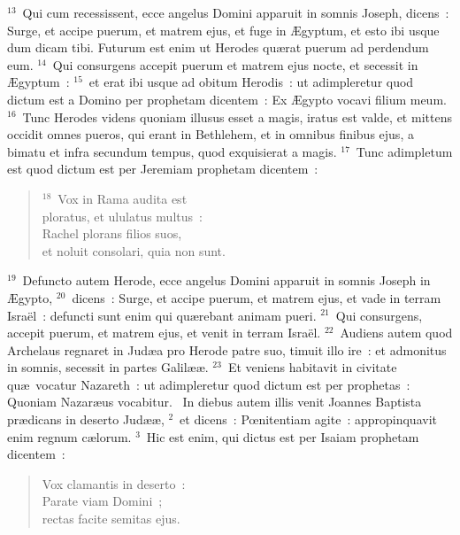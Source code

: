 ${}^{13}$~Qui cum recessissent, ecce angelus Domini apparuit in somnis Joseph, dicens~: Surge, et accipe puerum, et matrem ejus, et fuge in \AE gyptum, et esto ibi usque dum dicam tibi. Futurum est enim ut Herodes qu\ae rat puerum ad perdendum eum.
${}^{14}$~Qui consurgens accepit puerum et matrem ejus nocte, et secessit in \AE gyptum~:
${}^{15}$~et erat ibi usque ad obitum Herodis~: ut adimpleretur quod dictum est a Domino per prophetam dicentem~: Ex \AE gypto vocavi filium meum.
${}^{16}$~Tunc Herodes videns quoniam illusus esset a magis, iratus est valde, et mittens occidit omnes pueros, qui erant in Bethlehem, et in omnibus finibus ejus, a bimatu et infra secundum tempus, quod exquisierat a magis.
${}^{17}$~Tunc adimpletum est quod dictum est per Jeremiam prophetam dicentem~:
\begin{flushleft}\begin{verse}${}^{18}$~Vox in Rama audita est\\ ploratus, et ululatus multus~:\\ Rachel plorans filios suos,\\ et noluit consolari, quia non sunt.\end{verse}\end{flushleft}


${}^{19}$~Defuncto autem Herode, ecce angelus Domini apparuit in somnis Joseph in \AE gypto,
${}^{20}$~dicens~: Surge, et accipe puerum, et matrem ejus, et vade in terram Isra\"el~: defuncti sunt enim qui qu\ae rebant animam pueri.
${}^{21}$~Qui consurgens, accepit puerum, et matrem ejus, et venit in terram Isra\"el.
${}^{22}$~Audiens autem quod Archelaus regnaret in Jud\ae a pro Herode patre suo, timuit illo ire~: et admonitus in somnis, secessit in partes Galil\ae \ae .
${}^{23}$~Et veniens habitavit in civitate qu\ae\ vocatur Nazareth~: ut adimpleretur quod dictum est per prophetas~: Quoniam Nazar\ae us vocabitur.
~In diebus autem illis venit Joannes Baptista pr\ae dicans in deserto Jud\ae \ae ,
${}^{2}$~et dicens~: Pœnitentiam agite~: appropinquavit enim regnum c\ae lorum.
${}^{3}$~Hic est enim, qui dictus est per Isaiam prophetam dicentem~: \begin{flushleft}\begin{verse}Vox clamantis in deserto~:\\ Parate viam Domini~;\\ rectas facite semitas ejus.\end{verse}\end{flushleft}



